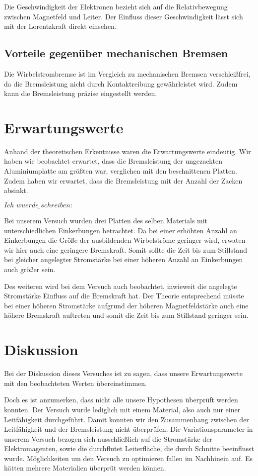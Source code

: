 Die Geschwindigkeit der Elektronen bezieht sich auf die
Relativbewegung zwischen Magnetfeld und Leiter. Der Einfluss dieser
Geschwindigkeit lässt sich mit der Lorentzkraft direkt einsehen.

\subsection{Vorteile gegenüber mechanischen Bremsen}

Die Wirbelstrombremse ist im Vergleich zu mechanischen Bremsen
verschleißfrei, da die Bremsleistung nicht durch Kontaktreibung
gewährleistet wird. Zudem kann die Bremsleistung präzise eingestellt
werden.

\section{Erwartungswerte}

Anhand der theoretischen Erkentnisse waren die Erwartungswerte eindeutig.
Wir haben wie beobachtet erwartet, dass die Bremsleistung der
ungezackten Aluminiumplatte am größten war, verglichen mit den
beschnittenen Platten.
Zudem haben wir erwartet, dass die Bremsleistung mit der Anzahl der
Zacken absinkt.

$\underline{Ich \,\, wuerde \,\, schreiben: }$

Bei unserem Versuch wurden drei Platten des selben Materials mit unterschiedlichen
Einkerbungen betrachtet. Da bei einer erhöhten Anzahl an Einkerbungen die Größe
der ausbildenden Wirbelströme geringer wird, erwaten wir hier auch eine geringere
Bremskraft. Somit sollte die Zeit bis zum Stillstand bei gleicher angelegter
Stromstärke bei einer höheren Anzahl an Einkerbungen auch größer sein.

Des weiteren wird bei dem Versuch auch beobachtet, inwieweit die angelegte
Stromstärke Einfluss auf die Bremskraft hat. Der Theorie entsprechend müsste
bei einer höheren Stromstärke aufgrund der höheren Magnetfeldstärke auch eine
höhere Bremskraft auftreten und somit die Zeit bis zum Stillstand geringer sein.

\section{Diskussion}

Bei der Diskussion dieses Versuches ist zu sagen, dass unsere Erwartungswerte
mit den beobachteten Werten übereinstimmen.

Doch es ist anzumerken, dass nicht alle unsere Hypothesen überprüft
werden konnten.
Der Versuch wurde lediglich mit einem Material, also auch nur einer
Leitfähigkeit durchgeführt. Damit konnten wir den Zusammenhang
zwischen der Leitfähigkeit und der Bremsleistung nicht überprüfen.
Die Variationsparameter in unserem Versuch bezogen sich
ausschließlich auf die Stromstärke der Elektromagenten, sowie
die durchflutet Leiterfläche, die durch Schnitte beeinflusst wurde.
Möglichkeiten um den Versuch zu optimieren fallen im Nachhinein auf.
Es hätten mehrere Materialien überprüt werden können.

